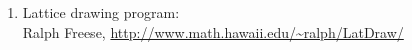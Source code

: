 \begin{survey}
\begin{enumerate}

  \item Lattice drawing program:
        \\Ralph Freese, \url{http://www.math.hawaii.edu/~ralph/LatDraw/}
\end{enumerate}
\end{survey}



